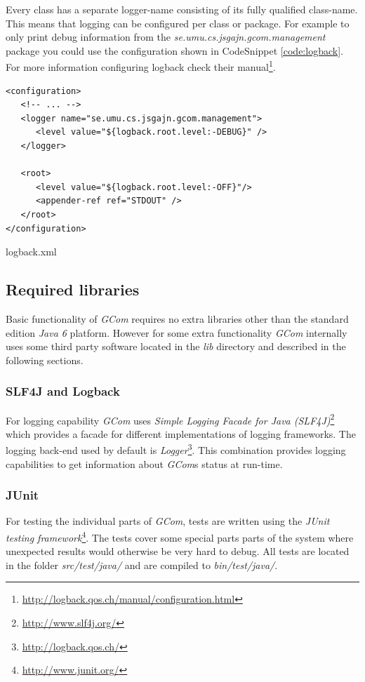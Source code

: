 \documentclass[titlepage, twocolumn, a4paper, 10pt]{article}
\begin{document}
Every class has a separate logger-name consisting of its fully
qualified class-name. This means that logging can be configured per
class or package. For example to only print debug information from the
\textit{se.umu.cs.jsgajn.gcom.management} package you could use the
configuration shown in CodeSnippet \ref{code:logback}. For more
information configuring logback check their
manual\footnote{\url{http://logback.qos.ch/manual/configuration.html}}.

\begin{code}
  \begin{footnotesize}
\begin{verbatim}
<configuration>
   <!-- ... -->
   <logger name="se.umu.cs.jsgajn.gcom.management">
      <level value="${logback.root.level:-DEBUG}" />
   </logger>

   <root>
      <level value="${logback.root.level:-OFF}"/>
      <appender-ref ref="STDOUT" />
   </root>
</configuration>
\end{verbatim}
  \end{footnotesize}
  \caption{logback.xml}\label{code:logback}
\end{code}

\subsection{Required libraries}\label{sec:required-libraries}
Basic functionality of \textit{GCom} requires no extra libraries other
than the standard edition \textit{Java 6} platform. However for some
extra functionality \textit{GCom} internally uses some third party
software located in the \textit{lib} directory and described in the
following sections.

\subsubsection{SLF4J and Logback}\label{sec:logback}
For logging capability \textit{GCom} uses \textit{Simple Logging
  Facade for Java (SLF4J)}\footnote{\url{http://www.slf4j.org/}} which
provides a facade for different implementations of logging frameworks.
The logging back-end used by default is
\textit{Logger}\footnote{\url{http://logback.qos.ch/}}. This
combination provides logging capabilities to get information about
\textit{GCom}s status at run-time.

\subsubsection{JUnit}\label{sec:junit}
For testing the individual parts of \textit{GCom}, tests are written
using the \textit{JUnit testing
  framework}\footnote{\url{http://www.junit.org/}}. The tests cover
some special parts parts of the system where unexpected results would
otherwise be very hard to debug. All tests are located in the folder
\textit{src/test/java/} and are compiled to \textit{bin/test/java/}.
\end{document}
